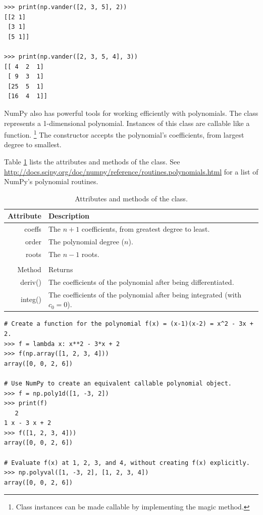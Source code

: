 \begin{lstlisting}
>>> print(np.vander([2, 3, 5], 2))
[[2 1]
 [3 1]
 [5 1]]

>>> print(np.vander([2, 3, 5, 4], 3))
[[ 4  2  1]
 [ 9  3  1]
 [25  5  1]
 [16  4  1]]
\end{lstlisting}

NumPy also has powerful tools for working efficiently with polynomials.
The class  represents a 1-dimensional polynomial.
Instances of this class are callable like a function.%
\footnote{Class instances can be made callable by implementing the  magic method.}
The constructor accepts the polynomial's coefficients, from largest degree to smallest.

Table \ref{table:numpy-poly1d} lists the attributes and methods of the  class.
See \url{http://docs.scipy.org/doc/numpy/reference/routines.polynomials.html} for a list of NumPy's polynomial routines.

\begin{table}[H]
\begin{tabular}{r|l}
    Attribute & Description \\
    \hline
    coeffs & The $n+1$ coefficients, from greatest degree to least. \\
    order & The polynomial degree ($n$). \\
    roots & The $n-1$ roots. \\
    \\
    Method & Returns \\
    \hline
    deriv() & The coefficients of the polynomial after being differentiated. \\
    integ() & The coefficients of the polynomial after being integrated (with $c_0 = 0$).
\end{tabular}
\caption{Attributes and methods of the  class.}
\label{table:numpy-poly1d}
\end{table}
%
\begin{lstlisting}
# Create a function for the polynomial f(x) = (x-1)(x-2) = x^2 - 3x + 2.
>>> f = lambda x: x**2 - 3*x + 2
>>> f(np.array([1, 2, 3, 4]))
array([0, 0, 2, 6])

# Use NumPy to create an equivalent callable polynomial object.
>>> f = np.poly1d([1, -3, 2])
>>> print(f)
   2
1 x - 3 x + 2
>>> f([1, 2, 3, 4]))
array([0, 0, 2, 6])

# Evaluate f(x) at 1, 2, 3, and 4, without creating f(x) explicitly.
>>> np.polyval([1, -3, 2], [1, 2, 3, 4])
array([0, 0, 2, 6])
\end{lstlisting}

